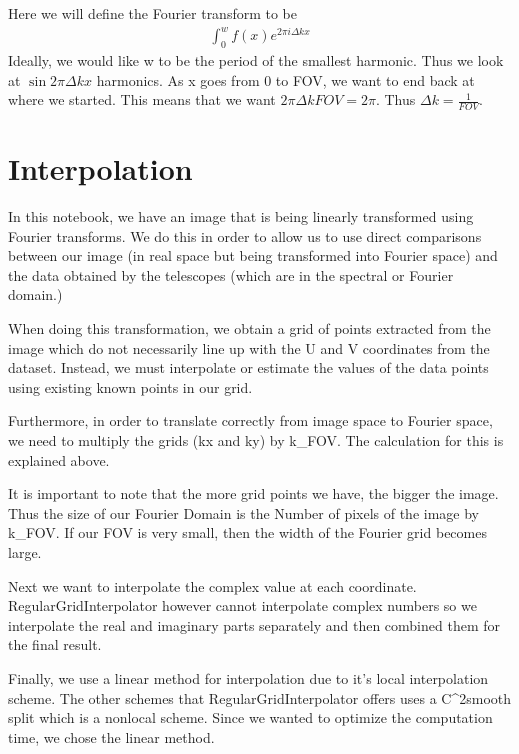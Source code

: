\documentclass[letterpaper,10pt,english]{jupyterBook}
\begin{document}
\sphinxAtStartPar
Here we will define the Fourier transform to be
\begin{equation*}
\begin{split}\int_0^wf(x)e^{2\pi i \Delta k x}\end{split}
\end{equation*}
\sphinxAtStartPar
Ideally, we would like w to be the period of the smallest harmonic. Thus we look at \(\sin 2\pi \Delta k x\) harmonics. As x goes from 0 to FOV, we want to end back at where we started. This means that we want \( 2\pi \Delta k FOV = 2\pi\). Thus \(\Delta k = \frac{1}{FOV}\).


\section{Interpolation}
\label{\detokenize{interpolation:interpolation}}
\sphinxAtStartPar
In this notebook, we have an image that is being linearly transformed using Fourier transforms. We do this in order to allow us to use direct comparisons between our image (in real space but being transformed into Fourier space) and the data obtained by the telescopes (which are in the spectral or Fourier domain.)

\sphinxAtStartPar
When doing this transformation, we obtain a grid of points extracted from the image which do not necessarily line up with the U and V coordinates from the dataset. Instead, we must interpolate or estimate the values of the data points using existing known points in our grid.

\sphinxAtStartPar
Furthermore, in order to translate correctly from image space to Fourier space, we need to multiply the grids (kx and ky) by k\_FOV. The calculation for this is explained above.

\sphinxAtStartPar
It is important to note that the more grid points we have, the bigger the image. Thus the size of our Fourier Domain is the Number of pixels of the image by k\_FOV. If our FOV is very small, then the width of the Fourier grid becomes large.

\sphinxAtStartPar
Next we want to interpolate the complex value at each coordinate. RegularGridInterpolator however cannot interpolate complex numbers so we interpolate the real and imaginary parts separately and then combined them for the final result.

\sphinxAtStartPar
Finally, we use a linear method for interpolation due to it’s local interpolation scheme. The other schemes that RegularGridInterpolator offers uses a C\textasciicircum{}2\sphinxhyphen{}smooth split which is a non\sphinxhyphen{}local scheme. Since we wanted to optimize the computation time, we chose the linear method.
\end{document}
